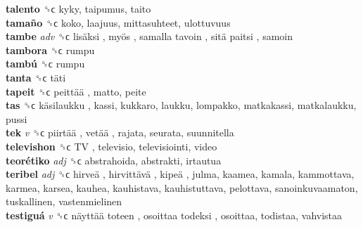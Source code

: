 \textbf{talento} ␝ϲ  kyky, taipumus, taito  \\
\textbf{tamaño} ␝ϲ  koko, laajuus, mittasuhteet, ulottuvuus  \\
\textbf{tambe} \emph{adv}  ␝ϲ   lisäksi ,  myös ,  samalla tavoin ,  sitä paitsi , samoin  \\
\textbf{tambora} ␝ϲ  rumpu  \\
\textbf{tambú} ␝ϲ  rumpu  \\
\textbf{tanta} ␝ϲ   täti   \\
\textbf{tapeit} ␝ϲ   peittää , matto, peite  \\
\textbf{tas} ␝ϲ   käsilaukku , kassi, kukkaro, laukku, lompakko, matkakassi, matkalaukku, pussi  \\
\textbf{tek} \emph{v}  ␝ϲ   piirtää ,  vetää , rajata, seurata, suunnitella  \\
\textbf{televishon} ␝ϲ   TV , televisio, televisiointi, video  \\
\textbf{teorétiko} \emph{adj}  ␝ϲ  abstrahoida, abstrakti, irtautua  \\
\textbf{teribel} \emph{adj}  ␝ϲ   hirveä ,  hirvittävä ,  kipeä , julma, kaamea, kamala, kammottava, karmea, karsea, kauhea, kauhistava, kauhistuttava, pelottava, sanoinkuvaamaton, tuskallinen, vastenmielinen  \\
\textbf{testiguá} \emph{v}  ␝ϲ   näyttää toteen ,  osoittaa todeksi , osoittaa, todistaa, vahvistaa  \\
